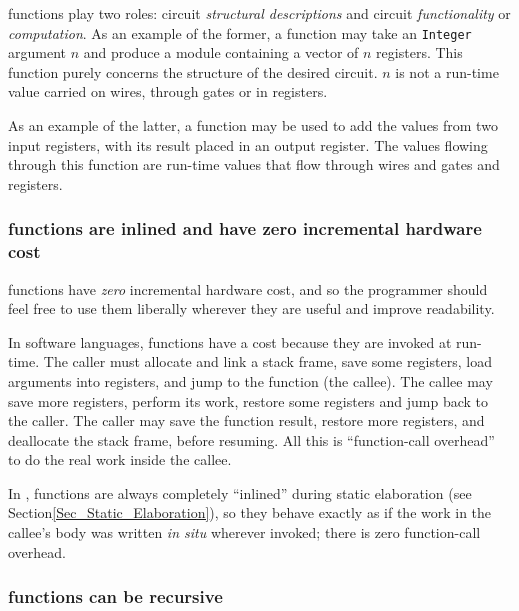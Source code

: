 {\BSV} functions play two roles: circuit \emph{structural
descriptions} and circuit \emph{functionality} or \emph{computation}.
As an example of the former, a {\BSV} function may take an
\verb|Integer| argument $n$ and produce a module containing a vector
of $n$ registers.  This function purely concerns the structure of the
desired circuit.  $n$ is not a run-time value carried on wires,
through gates or in registers.

As an example of the latter, a {\BSV} function may be used to add the
values from two input registers, with its result placed in an output
register.  The values flowing through this function are run-time
values that flow through wires and gates and registers.


\subsubsection{{\BSV} functions are inlined and have zero incremental hardware cost}


{\BSV} functions have \emph{zero} incremental hardware cost, and so
the programmer should feel free to use them liberally wherever they
are useful and improve readability.

In software languages, functions have a cost because they are invoked
at run-time.  The caller must allocate and link a stack frame, save
some registers, load arguments into registers, and jump to the
function (the callee).  The callee may save more registers, perform
its work, restore some registers and jump back to the caller.  The
caller may save the function result, restore more registers, and
deallocate the stack frame, before resuming.  All this is
``function-call overhead'' to do the real work inside the callee.

In {\BSV}, functions are always completely ``inlined'' during static
elaboration (see Section\ref{Sec_Static_Elaboration}), so they behave
exactly as if the work in the callee's body was written \emph{in situ}
wherever invoked; there is zero function-call overhead.


\subsubsection{{\BSV} functions can be recursive}

